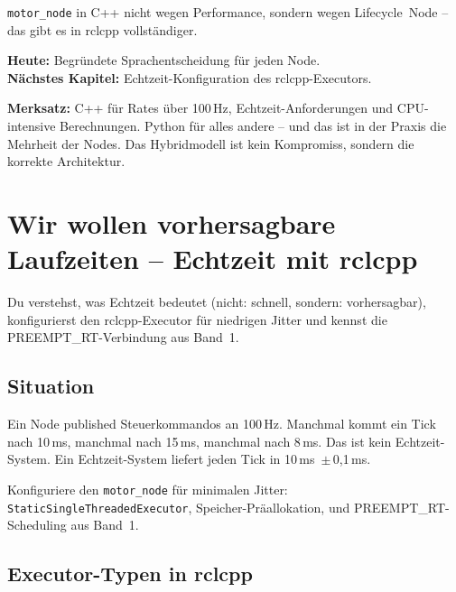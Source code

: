 \texttt{motor\_node} in C++ nicht wegen Performance,
sondern wegen Lifecycle~Node -- das gibt es in rclcpp vollständiger.

\begin{projektBox}
\textbf{Heute:} Begründete Sprachentscheidung für jeden Node.\\
\textbf{Nächstes Kapitel:} Echtzeit-Konfiguration des rclcpp-Executors.
\end{projektBox}

\begin{merksatzBox}
\textbf{Merksatz:}
C++ für Rates über 100\,Hz, Echtzeit-Anforderungen und CPU-intensive Berechnungen.
Python für alles andere -- und das ist in der Praxis die Mehrheit der Nodes.
Das Hybridmodell ist kein Kompromiss, sondern die korrekte Architektur.
\end{merksatzBox}


\chapter{Wir wollen vorhersagbare Laufzeiten –
  Echtzeit mit rclcpp}

\begin{lernziele}
Du verstehst, was Echtzeit bedeutet (nicht: schnell, sondern: vorhersagbar),
konfigurierst den rclcpp-Executor für niedrigen Jitter
und kennst die PREEMPT\_RT-Verbindung aus Band~1.
\end{lernziele}

\section{Situation}

Ein Node published Steuerkommandos an 100\,Hz.
Manchmal kommt ein Tick nach 10\,ms, manchmal nach 15\,ms, manchmal nach 8\,ms.
Das ist kein Echtzeit-System.
Ein Echtzeit-System liefert jeden Tick in 10\,ms~$\pm$\,0{,}1\,ms.

\begin{aufgabeBox}
Konfiguriere den \texttt{motor\_node} für minimalen Jitter:
\texttt{StaticSingleThreadedExecutor}, Speicher-Präallokation,
und PREEMPT\_RT-Scheduling aus Band~1.
\end{aufgabeBox}

\section{Executor-Typen in rclcpp}

